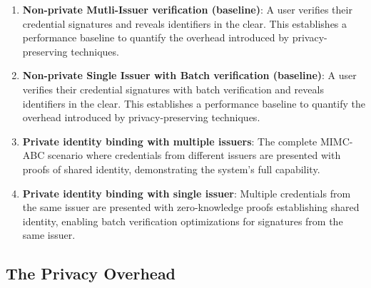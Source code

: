 \begin{enumerate}
    \item \textbf{Non-private Mutli-Issuer verification (baseline)}: A user verifies their credential signatures and reveals identifiers in the clear. This establishes a performance baseline to quantify the overhead introduced by privacy-preserving techniques.

    \item \textbf{Non-private Single Issuer with Batch verification (baseline)}: A user verifies their credential signatures with batch verification and reveals identifiers in the clear. This establishes a performance baseline to quantify the overhead introduced by privacy-preserving techniques.

    \item \textbf{Private identity binding with multiple issuers}: The complete MIMC-ABC scenario where credentials from different issuers are presented with proofs of shared identity, demonstrating the system's full capability.

    \item \textbf{Private identity binding with single issuer}: Multiple credentials from the same issuer are presented with zero-knowledge proofs establishing shared identity, enabling batch verification optimizations for signatures from the same issuer.

\end{enumerate}

\subsection{The Privacy Overhead}

